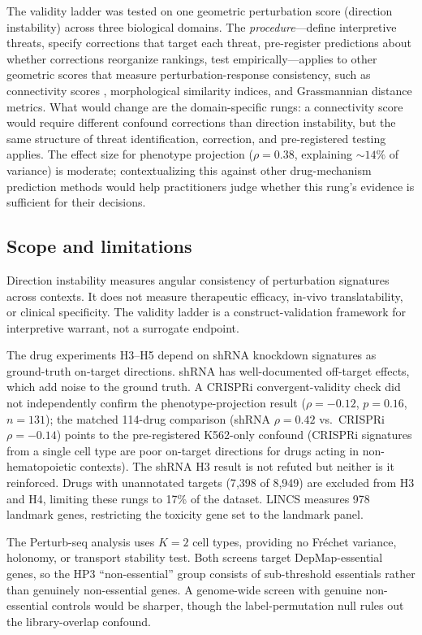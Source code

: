 \documentclass[10pt]{article}
\begin{document}
The validity ladder was tested on one geometric perturbation score
(direction instability) across three biological domains. The
\emph{procedure}---define interpretive threats, specify corrections
that target each threat, pre-register predictions about whether
corrections reorganize rankings, test empirically---applies to other
geometric scores that measure perturbation-response consistency, such as
connectivity scores \citep{subramanian2017next}, morphological similarity
indices, and Grassmannian distance metrics. What would change are the
domain-specific rungs: a connectivity score would require different
confound corrections than direction instability, but the same
structure of threat identification, correction, and pre-registered
testing applies. The effect size for phenotype projection ($\rho = 0.38$,
explaining ${\sim}14\%$ of variance) is moderate; contextualizing this
against other drug-mechanism prediction methods would help
practitioners judge whether this rung's evidence is sufficient for
their decisions.

\subsection{Scope and limitations}

Direction instability measures angular consistency of perturbation signatures
across contexts. It does not measure therapeutic efficacy, in-vivo
translatability, or clinical specificity. The validity ladder is a
construct-validation framework for interpretive warrant, not a surrogate
endpoint.

The drug experiments H3--H5 depend on shRNA knockdown signatures as
ground-truth on-target directions. shRNA has well-documented off-target
effects, which add noise to the ground truth. A CRISPRi
convergent-validity check did not
independently confirm the phenotype-projection result ($\rho = -0.12$,
$p = 0.16$, $n = 131$); the matched 114-drug comparison (shRNA
$\rho = 0.42$ vs.\ CRISPRi $\rho = -0.14$) points to the
pre-registered K562-only confound (CRISPRi signatures from a single
cell type are poor on-target directions for drugs acting in
non-hematopoietic contexts). The shRNA H3 result is not refuted but
neither is it reinforced. Drugs with unannotated targets
(7{,}398 of 8{,}949) are excluded from H3 and H4, limiting these rungs
to 17\% of the dataset. LINCS measures 978 landmark genes, restricting
the toxicity gene set to the landmark panel.

The Perturb-seq analysis uses $K = 2$ cell types, providing no Fr\'echet
variance, holonomy, or transport stability test. Both screens target
DepMap-essential genes, so the HP3 ``non-essential'' group consists of
sub-threshold essentials rather than genuinely non-essential genes. A
genome-wide screen with genuine non-essential controls would be sharper,
though the label-permutation null rules out the library-overlap confound.
\end{document}
